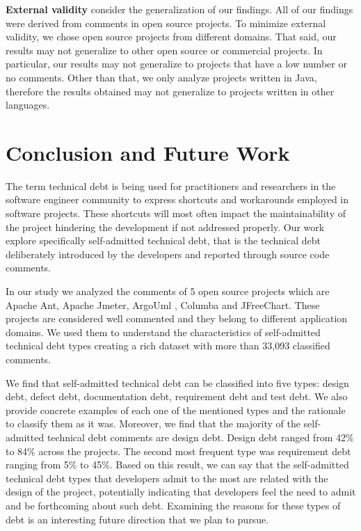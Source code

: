 \noindent \textbf{External validity} consider the generalization of our findings. All of our findings were derived from comments in open source projects. To minimize external validity, we chose open source projects from different domains. That said, our results may not generalize to other open source or commercial projects. In particular, our results may not generalize to projects that have a low number or no comments. Other than that, we only analyze projects written in Java, therefore the results obtained may not generalize to projects written in other languages.

\section{Conclusion and Future Work}
\label{chap3:sec:conclusion}

The term technical debt is being used for practitioners and researchers in the software engineer community to express shortcuts and workarounds employed in software projects. These shortcuts will most often impact the maintainability of the project hindering the development if not addressed properly. Our work explore specifically self-admitted technical debt, that is the technical debt deliberately introduced by the developers and reported through source code comments.

In our study we analyzed the comments of 5 open source projects which are Apache Ant, Apache Jmeter, ArgoUml , Columba and JFreeChart. These projects are considered well commented and they belong to different application domains. We used them to understand the characteristics of self-admitted technical debt types creating a rich dataset with more than 33,093 classified comments.

We find that self-admitted technical debt can be classified into five types: design debt, defect debt, documentation debt, requirement debt and test debt. We also provide concrete examples of each one of the mentioned types and the rationale to classify them as it was. Moreover, we find that the majority of the self-admitted technical debt comments are design debt. Design debt ranged from 42\% to 84\% across the projects. The second most frequent type was requirement debt ranging from 5\% to 45\%. Based on this result, we can say that the self-admitted technical debt types that developers admit to the most are related with the design of the project, potentially indicating that developers feel the need to admit and be forthcoming about such debt. Examining the reasons for these types of debt is an interesting future direction that we plan to pursue.

